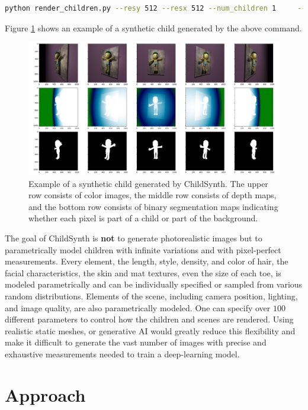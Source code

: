 \documentclass{article}
\begin{document}
\begin{lstlisting}[language=bash]
python render_children.py --resy 512 --resx 512 --num_children 1     --output_dir ./output 
\end{lstlisting}

Figure \ref{fig:child_0} shows an example of a synthetic child generated by the above command.

\begin{figure}[]
    \centering
    \includegraphics[width=\textwidth]{plots/child_0.png}
    \caption{Example of a synthetic child generated by ChildSynth. The upper row consists of color images, the middle row consists of depth maps, and the bottom row consists of binary segmentation maps indicating whether each pixel is part of a child or part of the background.}
    \label{fig:child_0}
\end{figure}

The goal of ChildSynth is \textbf{not} to generate photorealistic images but to parametrically model children with infinite variations and with pixel-perfect measurements. Every element, the length, style, density, and color of hair, the facial characteristics, the skin and mat textures, even the size of each toe, is modeled parametrically and can be individually specified or sampled from various random distributions. Elements of the scene, including camera position, lighting, and image quality, are also parametrically modeled. One can specify over $100$ different parameters to control how the children and scenes are rendered. Using realistic static meshes, or generative AI would greatly reduce this flexibility and make it difficult to generate the vast number of images with precise and exhaustive measurements needed to train a deep-learning model.

\section{Approach}
\end{document}
